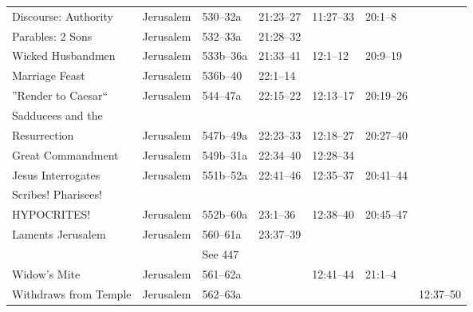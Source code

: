 \begin{longtable}[h]{l@{\hspace{0.5em}}l@{\hspace{0.5em}}l@{\hspace{0.5em}}BBBB}
\quad Discourse: Authority                 & Jerusalem           & 530--32a           & 21:23--27         & 11:27--33          & 20:1--8               & \\
\quad Parables: 2 Sons                     & Jerusalem           & 532--33a           & 21:28--32         &                    &                       & \\
\qquad Wicked Husbandmen                   & Jerusalem           & 533b--36a          & 21:33--41         & 12:1--12           & 20:9--19              & \\
\qquad Marriage Feast                      & Jerusalem           & 536b--40           & 22:1--14          &                    &                       & \\
''Render to Caesar``                       & Jerusalem           & 544--47a           & 22:15--22         & 12:13--17          & 20:19--26             & \\
\quad Sadducees and the \\
\qquad Resurrection                        & Jerusalem           & 547b--49a          & 22:23--33         & 12:18--27          & 20:27--40             & \\
\quad Great Commandment                    & Jerusalem           & 549b--31a          & 22:34--40         & 12:28--34          &                       & \\
\quad Jesus Interrogates                   & Jerusalem           & 551b--52a          & 22:41--46         & 12:35--37          & 20:41--44             & \\
\quad Scribes! Pharisees! \\
\qquad HYPOCRITES!                         & Jerusalem           & 552b--60a          & 23:1--36          & 12:38--40          & 20:45--47             & \\
\quad Laments Jerusalem                    & Jerusalem           & 560--61a           & 23:37--39         &                    &                       & \\
                                           &                     & See 447            &                   &                    &                       & \\
\quad Widow's Mite                         & Jerusalem           & 561--62a           &                   & 12:41--44          & 21:1--4               & \\
\quad Withdraws from Temple                & Jerusalem           & 562--63a           &                   &                    &                       & 12:37--50 \\

\end{longtable}
